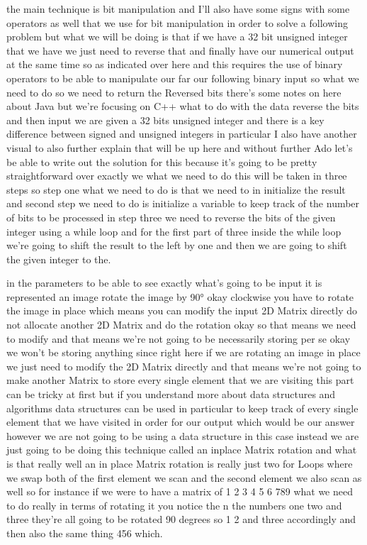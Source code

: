 \expandafter\def\csname sourceexcerpt@54\endcsname{%
the main technique is bit manipulation and I'll also have some signs with some
operators as well that we use for bit manipulation in order to solve a following
problem but what we will be doing is that if we have a 32 bit unsigned integer that we
have we just need to reverse that and finally have our numerical output at the same
time so as indicated over here and this requires the use of binary operators to be
able to manipulate our far our following binary input so what we need to do so we need
to return the Reversed bits there's some notes on here about Java but we're focusing
on C++ what to do with the data reverse the bits and then input we are given a 32 bits
unsigned integer and there is a key difference between signed and unsigned integers
in particular I also have another visual to also further explain that will be up here
and without further Ado let's be able to write out the solution for this because it's
going to be pretty straightforward over exactly we what we need to do this will be
taken in three steps so step one what we need to do is that we need to in initialize
the result and second step we need to do is initialize a variable to keep track of the
number of bits to be processed in step three we need to reverse the bits of the given
integer using a while loop and for the first part of three inside the while loop we're
going to shift the result to the left by one and then we are going to shift the given
integer to the.
}

\expandafter\def\csname sourceexcerpt@55\endcsname{%
in the parameters to be able to see exactly what's going to be input it is represented
an image rotate the image by 90° okay clockwise you have to rotate the image in place
which means you can modify the input 2D Matrix directly do not allocate another 2D
Matrix and do the rotation okay so that means we need to modify and that means we're
not going to be necessarily storing per se okay we won't be storing anything since
right here if we are rotating an image in place we just need to modify the 2D Matrix
directly and that means we're not going to make another Matrix to store every single
element that we are visiting this part can be tricky at first but if you understand
more about data structures and algorithms data structures can be used in particular to
keep track of every single element that we have visited in order for our output which
would be our answer however we are not going to be using a data structure in this case
instead we are just going to be doing this technique called an inplace Matrix rotation
and what is that really well an in place Matrix rotation is really just two for Loops
where we swap both of the first element we scan and the second element we also scan as
well so for instance if we were to have a matrix of 1 2 3 4 5 6 789 what we need to do
really in terms of rotating it you notice the n the numbers one two and three they're
all going to be rotated 90 degrees so 1 2 and three accordingly and then also the same
thing 456 which.
}

